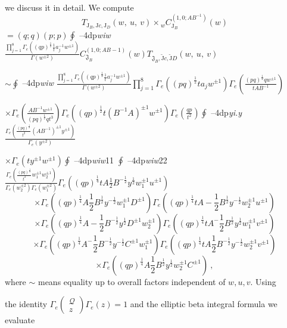 \documentclass[a4paper,12pt]{article}
\begin{document}
we discuss it in detail. We compute
$$
T_{\mathrm{J}_{B},\mathrm{J}c,\mathrm{J}_{D}}(w,\ u,\ v)\times {}_{w}C_{\mathrm{J}_{B}}^{(1,0;AB^{-1})}(w)
$$
$=(q;q)(p;p)\displaystyle \oint$ --4dp{\it wiw} $\displaystyle \frac{\prod_{j=1}^{8}\Gamma_{e}((qp)^{\frac{1}{2}}\frac{1}{t}a_{j}^{-1}w^{\pm 1})}{\Gamma(w^{\pm 2})}C_{\mathfrak{J}_{B}}^{(1,0;AB- 1)}(w)T_{\mathfrak{J}_{B},\tilde{\mathrm{J}}c,\tilde{\mathrm{J}}D}(w,\ u,\ v)$

$\displaystyle \sim\oint$ --4dp{\it wiw} $\displaystyle \frac{\prod_{j=1}^{8}\Gamma_{e}((qp)^{\frac{1}{2}}\frac{1}{t}a_{j}^{-1}w^{\pm 1})}{\Gamma(w^{\pm 2})}\prod_{j=1}^{8}\Gamma_{e}((pq)^{\frac{1}{2}}ta_{j}w^{\pm 1})\Gamma_{e} (\displaystyle \frac{(pq)^{\frac{1}{2}}qw^{\pm 1}}{tAB^{-1}})$

$\times\Gamma_{e} (\displaystyle \frac{AB^{-1}w^{\pm 1}}{(pq)^{\frac{1}{2}}qt^{3}})\Gamma_{e}((qp)^{\frac{1}{2}}t(B^{-1}A)^{\pm 1}w^{\pm 1})\Gamma_{e}(\frac{qp}{t^{2}})\oint$ --4dp{\it yi.y} $\displaystyle \frac{\Gamma_{e}(\frac{(pq)^{\frac{1}{2}}}{t^{2}}(AB^{-1})^{\pm 1}y^{\pm 1})}{\Gamma_{e}(y^{\pm 2})}$

$\displaystyle \times\Gamma_{e}(ty^{\pm 1}w^{\pm 1})\oint$ --4dp{\it wiw}11 $\displaystyle \oint$ --4dp{\it wiw}22 $\displaystyle \frac{\Gamma_{e}(\frac{(pq)^{\frac{1}{2}}}{t^{2}}w_{1}^{\pm 1}w_{2}^{\pm 1})}{\Gamma_{e}(w_{2}^{\pm 2})\Gamma_{e}(w_{1}^{\pm 2})}\Gamma_{e}((qp)^{\frac{1}{4}}tA\frac{1}{2}B^{-\frac{1}{2}}y^{\frac{1}{2}}w_{1}^{\pm 1}u^{\pm 1})$
$$
\times\Gamma_{e}((qp)^{\frac{1}{4}}A\frac{1}{2}B^{\frac{1}{2}}y^{-\frac{1}{2}}w_{1}^{\pm 1}D^{\pm 1})\Gamma_{e}((qp)^{\frac{1}{4}}tA-\frac{1}{2}B^{\frac{1}{2}}y^{-\frac{1}{2}}w_{2}^{\pm 1}u^{\pm 1})
$$
$$
\times\Gamma_{e}((qp)^{\frac{1}{4}}A-\frac{1}{2}B^{-\frac{1}{2}}y^{\frac{1}{2}}D^{\pm 1}w_{2}^{\pm 1})\Gamma_{e}((qp)^{\frac{1}{4}}tA^{-}\frac{1}{2}B^{\frac{1}{2}}y^{\frac{1}{2}}w_{1}^{\pm 1}v^{\pm 1})
$$
$$
\times\Gamma_{e}((qp)^{\frac{1}{4}}A^{-}\frac{1}{2}B^{-\frac{1}{2}}y^{-\frac{1}{2}}C^{\pm 1}w_{1}^{\pm 1})\Gamma_{e}((qp)^{\frac{1}{4}}tA\frac{1}{2}B^{-\frac{1}{2}}y^{-\frac{1}{2}}w_{2}^{\pm 1}v^{\pm 1})
$$
$$
\times\Gamma_{e}((qp)^{\frac{1}{4}}A\frac{1}{2}B^{\frac{1}{2}}y^{\frac{1}{2}}w_{2}^{\pm 1}C^{\pm 1})\ ,
$$
where $\sim$ means equality up to overall factors independent of $w, u, v$. Using

the identity $\Gamma_{e}\left(\begin{array}{l}
\mathcal{Q}\\
z\ 
\end{array}\right)\Gamma_{e}(z)=1$ and the elliptic beta integral formula we evaluate
\end{document}
